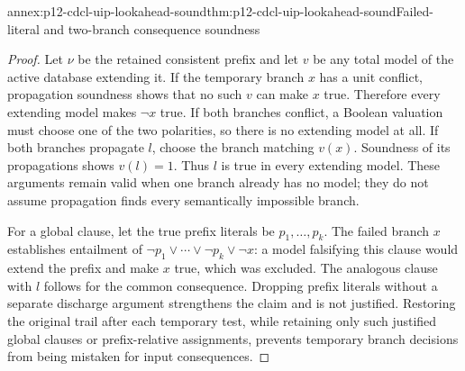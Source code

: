 \begin{annexitem}{annex:p12-cdcl-uip-lookahead-sound}{thm:p12-cdcl-uip-lookahead-sound}{Failed-literal and two-branch consequence soundness}
\begin{proof}
Let \(\nu\) be the retained consistent prefix and let \(v\) be any total
model of the active database extending it.  If the temporary branch \(x\)
has a unit conflict, propagation soundness shows that no such \(v\) can
make \(x\) true.  Therefore every extending model makes \(\neg x\)
true.  If both branches conflict, a Boolean valuation must choose one of
the two polarities, so there is no extending model at all.  If both branches
propagate \(l\), choose the branch matching \(v(x)\).  Soundness of its
propagations shows \(v(l)=1\).  Thus \(l\) is true in every extending
model.  These arguments remain valid when one branch already has no model;
they do not assume propagation finds every semantically impossible branch.

For a global clause, let the true prefix literals be \(p_1,\ldots,p_k\).
The failed branch \(x\) establishes entailment of
\(\neg p_1\lor\cdots\lor\neg p_k\lor\neg x\): a model falsifying
this clause would extend the prefix and make \(x\) true, which was excluded.
The analogous clause with \(l\) follows for the common consequence.  Dropping
prefix literals without a separate discharge argument strengthens the claim
and is not justified.  Restoring the original trail after each temporary
test, while retaining only such justified global clauses or prefix-relative
assignments, prevents temporary branch decisions from being mistaken for
input consequences.
\end{proof}
\end{annexitem}
